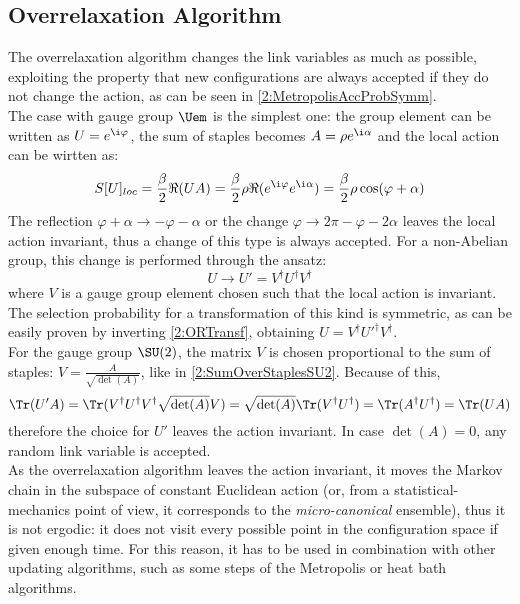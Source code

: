 \subsection{Overrelaxation Algorithm}
The overrelaxation algorithm changes the link variables as much as possible, exploiting the property that new configurations are always accepted if they do not change the action, as can be seen in \eqref{2:MetropolisAccProbSymm}.\\
The case with gauge group $\Uem$ is the simplest one: the group element can be written as $U=e^{\i\varphi}$, the sum of staples becomes $A=\rho e^{\i\alpha}$ and the local action can be wirtten as:
\begin{equation}
    S[U]_{loc} = \frac\beta2 \Re(UA) = \frac\beta2 \rho \Re(e^{\i\varphi}e^{\i\alpha}) = \frac\beta2\rho\cos(\varphi+\alpha) \label{2:SlocORU1}  
\end{equation}
The reflection $\varphi+\alpha\to-\varphi-\alpha$ or the change $\varphi\to2\pi-\varphi-2\alpha$ leaves the local action invariant, thus a change of this type is always accepted.
For a non-Abelian group, this change is performed through the ansatz:
\begin{equation}
    U \to U' = V^\dagger U^\dagger V^\dagger \label{2:ORTransf}
\end{equation}
where $V$ is a gauge group element chosen such that the local action is invariant.
The selection probability for a transformation of this kind is symmetric, as can be easily proven by inverting \eqref{2:ORTransf}, obtaining $U = V^\dagger U'^\dagger V^\dagger$.\\
For the gauge group $\SU(2)$, the matrix $V$ is chosen proportional to the sum of staples: $V=\frac{A}{\sqrt{\det(A)}}$, like in \eqref{2:SumOverStaplesSU2}.
Because of this,
\begin{equation}
    \Tr(U'A) = \Tr(V^\dagger U^\dagger V^\dagger \sqrt{\det(A)} V) = \sqrt{\det(A)} \Tr(V^\dagger U^\dagger) = \Tr(A^\dagger U^\dagger) = \Tr(UA) \label{2:ORTrace}
\end{equation}
therefore the choice for $U'$ leaves the action invariant.
In case $\det(A)=0$, any random link variable is accepted.\\
As the overrelaxation algorithm leaves the action invariant, it moves the Markov chain in the subspace of constant Euclidean action (or, from a statistical-mechanics point of view, it corresponds to the \emph{micro-canonical} ensemble), thus it is not ergodic: it does not visit every possible point in the configuration space if given enough time.
For this reason, it has to be used in combination with other updating algorithms, such as some steps of the Metropolis or heat bath algorithms.

